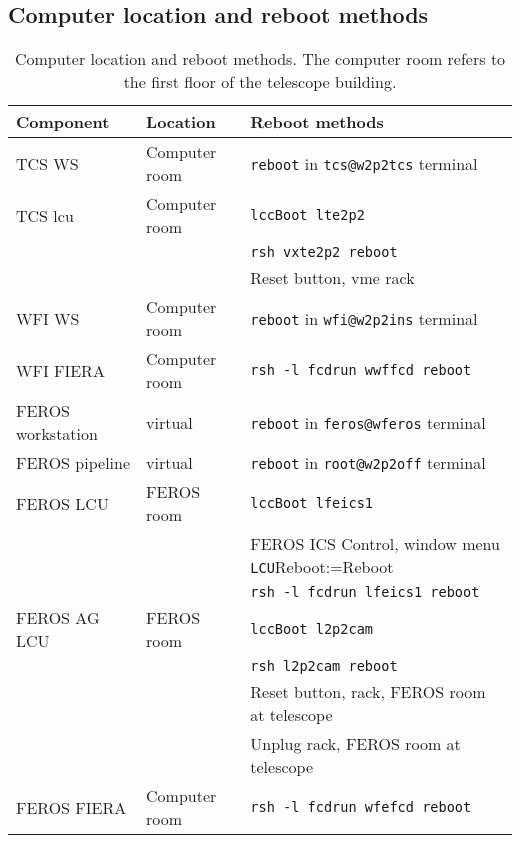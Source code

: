 \documentclass[11pt,fleqn,a4paper]{book}
\makeatletter
\def\menu#1#2{\texttt{#1}\ifx{}#2\else\@for\@x:=#2\do{$\rightarrow$\texttt{\@x}}\fi}
\def\wmenu#1#2{window menu \menu{#1}{#2}}
\makeatother
\begin{document}
\subsection{Computer location and reboot methods}
\begin{table}[t]
\caption[Computer location and reboot methods]{Computer location and reboot methods. The computer room refers to the first floor of the telescope building.}
\label{tab:reboots}
\centering
\begin{tabular}{lll}
\hline
Component             & Location      & Reboot methods\\
\hline\hline
TCS WS                & Computer room & \texttt{reboot} in \texttt{tcs@w2p2tcs} terminal\\  
TCS \gls{lcu}         & Computer room & \texttt{\gls{lccBoot} \gls{lte2p2}}\\  
                      &               & \texttt{rsh vxte2p2 reboot}\\ 
                      &               &  Reset button, \gls{vme} rack\\
\hline
WFI WS                & Computer room & \texttt{reboot} in \texttt{wfi@\gls{w2p2ins}} terminal\\
WFI FIERA             & Computer room & \texttt{rsh -l fcdrun \gls{wwffcd} reboot}\\
\hline
FEROS workstation     & virtual       & \texttt{reboot} in \texttt{feros@wferos} terminal\\ 
FEROS pipeline        & virtual       & \texttt{reboot} in \texttt{root@w2p2off} terminal\\
FEROS LCU             & FEROS room    & \texttt{\gls{lccBoot} \gls{lfeics1}}\\
                      &               & FEROS \gls{ICS Control}, \wmenu{LCU}{Reboot}\\
                      &               & \texttt{rsh -l fcdrun lfeics1 reboot}\\
FEROS AG LCU          & FEROS room    & \texttt{\gls{lccBoot} \gls{l2p2cam}}\\
                      &               & \texttt{rsh \gls{l2p2cam} reboot}\\
                      &               & Reset button, rack, FEROS room at telescope\\
                      &               & Unplug rack, FEROS room at telescope\\
FEROS FIERA           & Computer room & \texttt{rsh -l fcdrun \gls{wfefcd} reboot}\\

\end{tabular}
\end{table}
\end{document}
